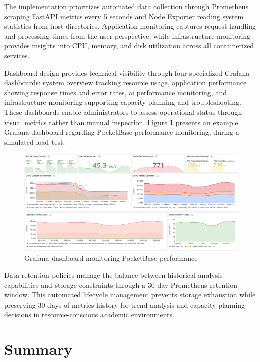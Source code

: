 The implementation prioritizes automated data collection through Prometheus scraping FastAPI metrics every 5 seconds and Node Exporter reading system statistics from host directories. Application monitoring captures request handling and processing times from the user perspective, while infrastructure monitoring provides insights into CPU, memory, and disk utilization across all containerized services.

Dashboard design provides technical visibility through four specialized Grafana dashboards: system overview tracking resource usage, application performance showing response times and error rates, \ac{ai} performance monitoring, and infrastructure monitoring supporting capacity planning and troubleshooting. These dashboards enable administrators to assess operational status through visual metrics rather than manual inspection. Figure \ref{fig:docker_architecture} presents an example Grafana dashboard regarding PocketBase performance monitoring, during a simulated load test.

\begin{figure}[htbp]
    \centering
    \includegraphics[width=\textwidth]{figs/chapter4/grafana_dashboard.png}
    \caption[Grafana Dashboard Monitoring]{Grafana dashboard monitoring PocketBase performance}
    \label{fig:docker_architecture}
\end{figure}

Data retention policies manage the balance between historical analysis capabilities and storage constraints through a 30-day Prometheus retention window. This automated lifecycle management prevents storage exhaustion while preserving 30 days of metrics history for trend analysis and capacity planning decisions in resource-conscious academic environments.

\section{Summary} \label{section:implementation_summary}


